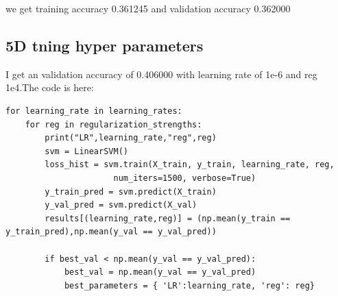 \documentclass[pdftex,11pt]{article}
\begin{document}
we get training accuracy 0.361245 and validation accuracy 0.362000

\subsection{5D tning hyper parameters}
I get an validation accuracy of 0.406000 with learning rate of 1e-6 and reg 1e4.The code is here:
\begin{lstlisting}
for learning_rate in learning_rates:
    for reg in regularization_strengths:
        print("LR",learning_rate,"reg",reg)
        svm = LinearSVM()
        loss_hist = svm.train(X_train, y_train, learning_rate, reg,
                      num_iters=1500, verbose=True)
        y_train_pred = svm.predict(X_train)
        y_val_pred = svm.predict(X_val)
        results[(learning_rate,reg)] = (np.mean(y_train == y_train_pred),np.mean(y_val == y_val_pred))
        
        if best_val < np.mean(y_val == y_val_pred):
            best_val = np.mean(y_val == y_val_pred)
            best_parameters = { 'LR':learning_rate, 'reg': reg}




\end{lstlisting}
\end{document}
